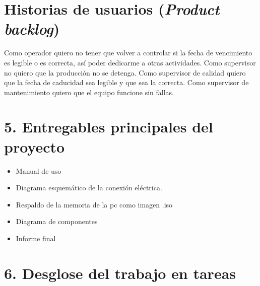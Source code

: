 \documentclass[11pt]{charter}
\begin{document}

\section{Historias de usuarios (\textit{Product backlog})}
\label{sec:backlog}


Como operador quiero no tener que volver a controlar si la fecha de vencimiento es legible o es correcta, así poder dedicarme a otras actividades.\newline
Como supervisor no quiero que la producción no se detenga. \newline
Como supervisor de calidad quiero que la fecha de caducidad sea legible y que sea la correcta.\newline
Como supervisor de mantenimiento quiero que el equipo funcione sin fallas. 



\section{5. Entregables principales del proyecto}
\label{sec:entregables}

\begin{itemize}
\item Manual de uso
\item Diagrama esquemático de la conexión eléctrica. 
\item Respaldo de la memoria de la pc como imagen .iso
\item Diagrama de componentes
\item Informe final

\end{itemize}

\newpage
\section{6. Desglose del trabajo en tareas}
\label{sec:wbs}

\end{document}
